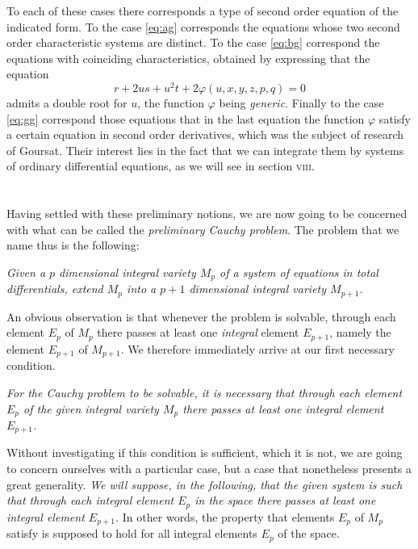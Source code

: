 \documentclass[leqno,11pt]{book}
\makeatletter
\theoremstyle{shape1}
\theoremstyle{shapesmall}
\let\old@phi\phi
\let\old@varphi\varphi
\let\phi\old@varphi
\let\varphi\old@phi
\newcommand{\somespace}{\vspace{9pt}}
\makeatother
\begin{document}
To each of these cases there corresponds a type of second order equation of the indicated form. To the case \eqref{eq:ag} corresponds the equations whose two second order characteristic systems are distinct. To the case \eqref{eq:bg} correspond the equations with coinciding characteristics, obtained by expressing that the equation
\[
r+2us+u^{2}t+2\phi(u,x,y,z,p,q)=0
\]
admits a double root for $u$, the function $\phi$ being \emph{generic}. Finally to the case \eqref{eq:gg} correspond those equations that in the last equation the function $\phi$ satisfy a certain equation in second order derivatives, which was the subject of research of Goursat. Their interest lies in the fact that we can integrate them by systems of ordinary differential equations, as we will see in section \textsc{viii}.


\section{}
\label{sec:3}

Having settled with these preliminary notions, we are now going to be concerned with what can be called the \emph{preliminary Cauchy problem}. The problem that we name thus is the following:

\somespace

\emph{Given a $p$ dimensional integral variety $M_{p}$ of a system of equations in total differentials, extend $M_{p}$ into a $p+1$ dimensional integral variety $M_{p+1}$.}

\somespace

An obvious observation is that whenever the problem is solvable, through each element $E_{p}$ of $M_{p}$ there passes at least one \emph{integral} element $E_{p+1}$, namely the element $E_{p+1}$ of $M_{p+1}$. We therefore immediately arrive at our first necessary condition.

\emph{For the Cauchy problem to be solvable, it is necessary that through each element $E_{p}$ of the given integral variety $M_{p}$ there passes at least one integral element $E_{p+1}$.} 

Without investigating if this condition is sufficient, which it is not, we are going to concern ourselves with a particular case, but a case that nonetheless presents a great generality. \emph{We will suppose, in the following, that the given system is such that through each integral element $E_{p}$ in the space there passes at least one integral element $E_{p+1}$.} In other words, the property that elements $E_{p}$ of $M_{p}$ satisfy is supposed to hold for all integral elements $E_{p}$ of the space.
\end{document}

